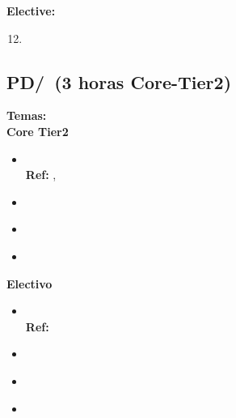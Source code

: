 \noindent \textbf{Elective:}
\begin{enumerate}
	\setcounter{enumi}{11}
	\item \PDCommunicationandCoordinationLOUseSemaphores\xspace[\PDCommunicationandCoordinationLOUseSemaphoresLevel]\label{sec:BOK:PDCommunicationandCoordinationLOUseSemaphores}
\end{enumerate}


\subsection{PD/\PDParallelAlgorithmsAnalysisandProgramming~(3 horas Core-Tier2)}\label{sec:BOK:PDParallelAlgorithmsAnalysisandProgramming}
\noindent \textbf{Temas:}\\
\noindent \textbf{Core Tier2}
\begin{itemize}
	\item \PDParallelAlgorithmsAnalysisandProgrammingTopicCritical\xspace \\ \textbf{Ref:} , \label{sec:BOK:PDParallelAlgorithmsAnalysisandProgrammingTopicCritical}
	\item \PDParallelAlgorithmsAnalysisandProgrammingTopicSpeed\label{sec:BOK:PDParallelAlgorithmsAnalysisandProgrammingTopicSpeed}
	\item \PDParallelAlgorithmsAnalysisandProgrammingTopicNaturally\label{sec:BOK:PDParallelAlgorithmsAnalysisandProgrammingTopicNaturally}
	\item \PDParallelAlgorithmsAnalysisandProgrammingTopicParallel\label{sec:BOK:PDParallelAlgorithmsAnalysisandProgrammingTopicParallel}
\end{itemize}

\noindent \textbf{Electivo}
\begin{itemize}
	\item \PDParallelAlgorithmsAnalysisandProgrammingTopicParallelGraph\xspace \\ \textbf{Ref:} \label{sec:BOK:PDParallelAlgorithmsAnalysisandProgrammingTopicParallelGraph}
	\item \PDParallelAlgorithmsAnalysisandProgrammingTopicParallelMatrix\label{sec:BOK:PDParallelAlgorithmsAnalysisandProgrammingTopicParallelMatrix}
	\item \PDParallelAlgorithmsAnalysisandProgrammingTopicProducer\label{sec:BOK:PDParallelAlgorithmsAnalysisandProgrammingTopicProducer}
	\item \PDParallelAlgorithmsAnalysisandProgrammingTopicExamples\label{sec:BOK:PDParallelAlgorithmsAnalysisandProgrammingTopicExamples}
\end{itemize}


